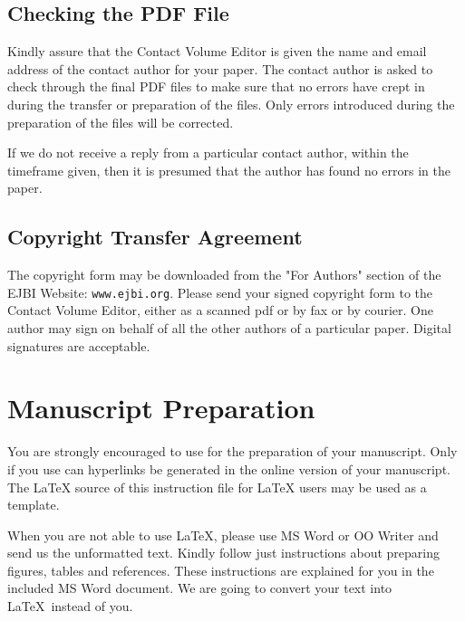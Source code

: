 \documentclass[a4paper,10pt,twocolumn,twoside,openright]{article}
\begin{document}
\subsection{Checking the PDF File}

Kindly assure that the Contact Volume Editor is given the name and email address of the contact author for your paper.  The contact author is asked to check through the final PDF files to make sure that no errors have crept in during the transfer or preparation of the files. Only errors introduced during the preparation of the files will be corrected.

If we do not receive a reply from a particular contact author, within the timeframe given, then it is presumed that the author has found no errors in the paper.



\subsection{Copyright Transfer Agreement}

The copyright form may be downloaded from the "For Authors" section of the EJBI Website: \texttt{www.ejbi.org}.  Please send your signed copyright form to the Contact Volume Editor, either as a scanned pdf or by fax or by courier. One author may sign on behalf of all the other authors of a particular paper. Digital signatures are acceptable.

\section{Manuscript Preparation}

You are strongly encouraged to use \LaTeXe{} for the preparation of your manuscript. Only if you use \LaTeXe{} can hyperlinks be generated in the online version of your manuscript. The \LaTeX{} source of this instruction file for \LaTeX{} users may be used as a template. 

When you are not able to use \LaTeX\/, please use MS Word or OO Writer and send us the unformatted text. Kindly follow just instructions about preparing figures, tables and references. These instructions are explained for you in the included MS Word document. We are going to convert your text into \LaTeX\ instead of you.
\end{document}
